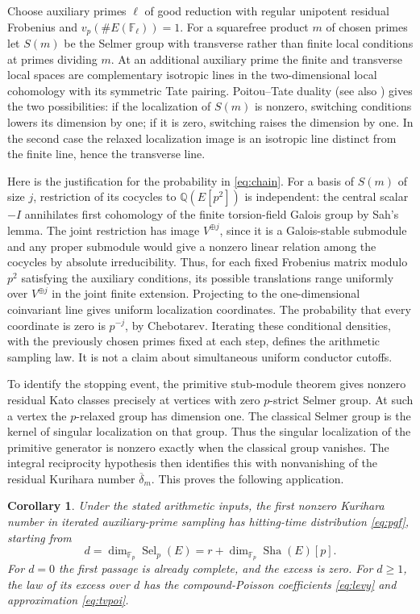 \documentclass[11pt]{article}
\newtheorem{corollary}[theorem]{Corollary}
\theoremstyle{definition}\newtheorem{definition}[theorem]{Definition}
\newcommand{\Sel}{\operatorname{Sel}}
\newcommand{\Sha}{\mathop{\mathrm{Sha}}}
\newcommand{\F}{\mathbb F}
\newcommand{\Q}{\mathbb Q}
\begin{document}
Choose auxiliary primes $\ell$ of good reduction with regular unipotent residual Frobenius and $v_p(\#E(\F_\ell))=1$. For a squarefree product $m$ of chosen primes let $S(m)$ be the Selmer group with transverse rather than finite local conditions at primes dividing $m$. At an additional auxiliary prime the finite and transverse local spaces are complementary isotropic lines in the two-dimensional local cohomology with its symmetric Tate pairing. Poitou--Tate duality (see also \cite{MR}) gives the two possibilities: if the localization of $S(m)$ is nonzero, switching conditions lowers its dimension by one; if it is zero, switching raises the dimension by one. In the second case the relaxed localization image is an isotropic line distinct from the finite line, hence the transverse line.

Here is the justification for the probability in \eqref{eq:chain}. For a basis of $S(m)$ of size $j$, restriction of its cocycles to $\Q(E[p^2])$ is independent: the central scalar $-I$ annihilates first cohomology of the finite torsion-field Galois group by Sah's lemma. The joint restriction has image $V^{\oplus j}$, since it is a Galois-stable submodule and any proper submodule would give a nonzero linear relation among the cocycles by absolute irreducibility. Thus, for each fixed Frobenius matrix modulo $p^2$ satisfying the auxiliary conditions, its possible translations range uniformly over $V^{\oplus j}$ in the joint finite extension. Projecting to the one-dimensional coinvariant line gives uniform localization coordinates. The probability that every coordinate is zero is $p^{-j}$, by Chebotarev. Iterating these conditional densities, with the previously chosen primes fixed at each step, defines the arithmetic sampling law. It is not a claim about simultaneous uniform conductor cutoffs.

To identify the stopping event, the primitive stub-module theorem gives nonzero residual Kato classes precisely at vertices with zero $p$-strict Selmer group. At such a vertex the $p$-relaxed group has dimension one. The classical Selmer group is the kernel of singular localization on that group. Thus the singular localization of the primitive generator is nonzero exactly when the classical group vanishes. The integral reciprocity hypothesis then identifies this with nonvanishing of the residual Kurihara number $\overline\delta_m$. This proves the following application.

\begin{corollary}\label{cor:arithmetic}
Under the stated arithmetic inputs, the first nonzero Kurihara number in iterated auxiliary-prime sampling has hitting-time distribution \eqref{eq:pgf}, starting from
\[
 d=\dim_{\F_p}\Sel_p(E)=r+\dim_{\F_p}\Sha(E)[p].
\]
For $d=0$ the first passage is already complete, and the excess is zero. For $d\geq1$, the law of its excess over $d$ has the compound-Poisson coefficients \eqref{eq:levy} and approximation \eqref{eq:tvpoi}.
\end{corollary}
\end{document}
